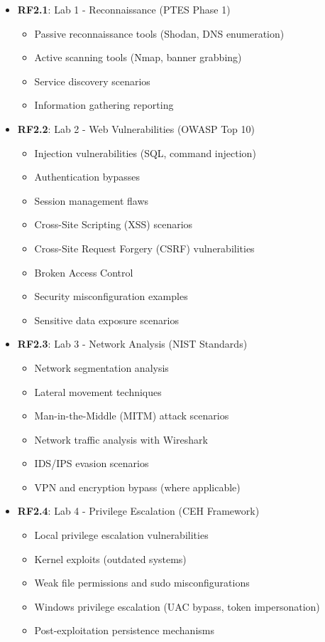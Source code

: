 \begin{itemize}

\item \textbf{RF2.1}: Lab 1 - Reconnaissance (PTES Phase 1)
\begin{itemize}
\item Passive reconnaissance tools (Shodan, DNS enumeration)
\item Active scanning tools (Nmap\cite{nmap}, banner grabbing)
\item Service discovery scenarios
\item Information gathering reporting
\end{itemize}

\item \textbf{RF2.2}: Lab 2 - Web Vulnerabilities (OWASP Top 10)
\begin{itemize}
\item Injection vulnerabilities (SQL, command injection)
\item Authentication bypasses
\item Session management flaws
\item Cross-Site Scripting (XSS) scenarios
\item Cross-Site Request Forgery (CSRF) vulnerabilities
\item Broken Access Control
\item Security misconfiguration examples
\item Sensitive data exposure scenarios
\end{itemize}

\item \textbf{RF2.3}: Lab 3 - Network Analysis (NIST Standards)
\begin{itemize}
\item Network segmentation analysis
\item Lateral movement techniques
\item Man-in-the-Middle (MITM) attack scenarios
\item Network traffic analysis with Wireshark\cite{wireshark}
\item IDS/IPS evasion scenarios
\item VPN and encryption bypass (where applicable)
\end{itemize}

\item \textbf{RF2.4}: Lab 4 - Privilege Escalation (CEH Framework)
\begin{itemize}
\item Local privilege escalation vulnerabilities
\item Kernel exploits (outdated systems)
\item Weak file permissions and sudo misconfigurations
\item Windows privilege escalation (UAC bypass, token impersonation)
\item Post-exploitation persistence mechanisms
\end{itemize}


\end{itemize}
